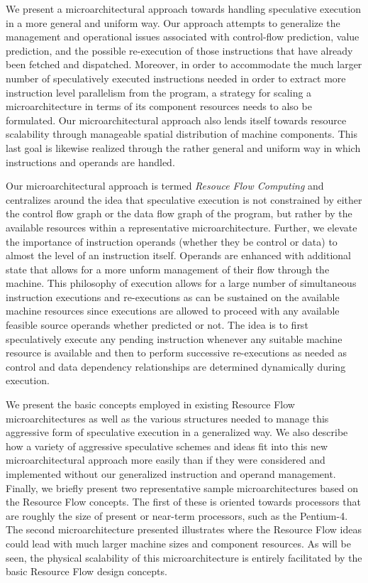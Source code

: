 \documentclass{book}
\begin{document}
We present a microarchitectural approach towards handling
speculative execution in a more general and uniform way.  Our approach
attempts to generalize the management and operational issues associated
with control-flow prediction, value prediction, and the possible
re-execution of those instructions that have already been fetched and
dispatched.  Moreover, in order to accommodate the much larger number
of speculatively executed instructions needed in order to extract more
instruction level parallelism from the program, a strategy for scaling a
microarchitecture in terms of its component resources needs to also be
formulated.  Our microarchitectural approach also lends itself towards
resource scalability through manageable spatial distribution of machine
components.  This last goal is likewise realized through the rather
general and uniform way in which instructions and operands are
handled.

Our microarchitectural approach is termed \textit{Resouce Flow
Computing} and centralizes around the idea that speculative execution
is not constrained by either the control flow graph or the data flow
graph of the program, but rather by the available resources within a
representative microarchitecture.  Further, we elevate the importance
of instruction operands (whether they be control or data) to almost the
level of an instruction itself.  Operands are enhanced with additional
state that allows for a more unform management of their flow through
the machine.  This philosophy of execution allows for a large number of
simultaneous instruction executions and re-executions as can be
sustained on the available machine resources since executions are
allowed to proceed with any available feasible source operands whether
predicted or not.  The idea is to first speculatively execute any
pending instruction whenever any suitable machine resource is available
and then to perform successive re-executions as needed as control and
data dependency relationships are determined dynamically during
execution.

We present the basic concepts employed in existing Resource
Flow microarchitectures as well as the
various structures needed to manage this aggressive form
of speculative execution in a generalized way.  
We also describe how a
variety of aggressive speculative schemes and ideas fit into this new
microarchitectural approach more easily than if they were considered
and implemented without our generalized instruction and operand
management.
Finally, we briefly present two representative sample microarchitectures
based on the Resource Flow concepts.
The first of these is oriented towards processors that are
roughly the size of present or near-term processors,
such as the Pentium-4. ~\cite{hinton01pentium}
The second microarchitecture presented illustrates
where the Resource Flow ideas could lead with much larger
machine sizes and component resources.
As will be seen, the physical scalability of this microarchitecture
is entirely facilitated by the basic Resource Flow design concepts.
%
%
\end{document}
